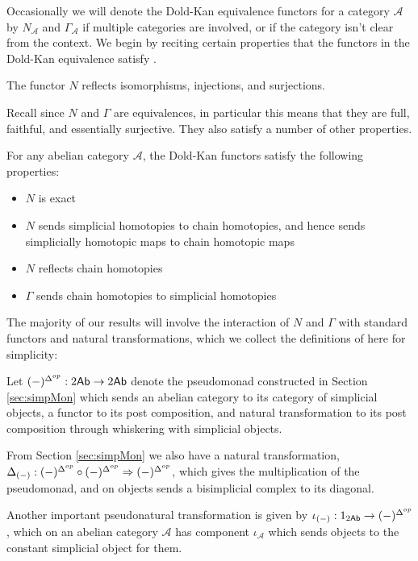 Occasionally we will denote the Dold-Kan equivalence functors for a category $\mathcal{A}$ by $N_\mathcal{A}$ and $\Gamma_\mathcal{A}$ if multiple categories are involved, or if the category isn't clear from the context. We begin by reciting certain properties that the functors in the Dold-Kan equivalence satisfy \cite[Section 14.24]{StacksProject}.

\begin{lem}[label=lem:refl]
    The functor $N$ reflects isomorphisms, injections, and surjections.
\end{lem}

Recall since $N$ and $\Gamma$ are equivalences, in particular this means that they are full, faithful, and essentially surjective. They also satisfy a number of other properties.

\begin{lem}[label=lem:doldKanProps]
    For any abelian category $\mathcal{A}$, the Dold-Kan functors satisfy the following properties:
    \begin{itemize}
        \item $N$ is exact
        \item $N$ sends simplicial homotopies to chain homotopies, and hence sends simplicially homotopic maps to chain homotopic maps
        \item $N$ reflects chain homotopies
        \item $\Gamma$ sends chain homotopies to simplicial homotopies
    \end{itemize}
\end{lem}

The majority of our results will involve the interaction of $N$ and $\Gamma$ with standard functors and natural transformations, which we collect the definitions of here for simplicity:

\begin{defn}[label=defn:Diag]{}
    Let $(-)^{\Delta^{op}}:2\textup{\textsf{Ab}}\rightarrow 2\textup{\textsf{Ab}}$ denote the pseudomonad constructed in Section \ref{sec:simpMon} which sends an abelian category to its category of simplicial objects, a functor to its post composition, and natural transformation to its post composition through whiskering with simplicial objects.

    From Section \ref{sec:simpMon} we also have a natural transformation, $\Delta_{(-)}:(-)^{\Delta^{op}}\circ (-)^{\Delta^{op}}\Rightarrow (-)^{\Delta^{op}}$, which gives the multiplication of the pseudomonad, and on objects sends a bisimplicial complex to its diagonal.


    Another important pseudonatural transformation is given by $\iota_{(-)}:1_{2\textup{\textsf{Ab}}}\rightarrow (-)^{\Delta^{op}}$, which on an abelian category $\mathcal{A}$ has component $\iota_\mathcal{A}$ which sends objects to the constant simplicial object for them.
\end{defn}

